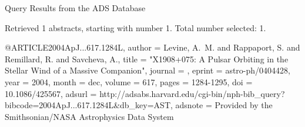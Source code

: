 Query Results from the ADS Database


Retrieved 1 abstracts, starting with number 1.  Total number selected: 1.

@ARTICLE{2004ApJ...617.1284L,
   author = {{Levine}, A.~M. and {Rappaport}, S. and {Remillard}, R. and 
	{Savcheva}, A.},
    title = "{X1908+075: A Pulsar Orbiting in the Stellar Wind of a Massive Companion}",
  journal = {\apj},
   eprint = {astro-ph/0404428},
     year = 2004,
    month = dec,
   volume = 617,
    pages = {1284-1295},
      doi = {10.1086/425567},
   adsurl = {http://adsabs.harvard.edu/cgi-bin/nph-bib_query?bibcode=2004ApJ...617.1284L&db_key=AST},
  adsnote = {Provided by the Smithsonian/NASA Astrophysics Data System}
}


